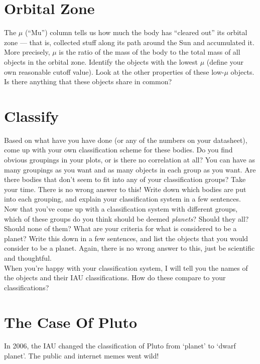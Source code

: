 \documentclass[12pt]{article}
\begin{document}
\section*{Orbital Zone}
The $\mu$ (``Mu'') column tells us how much the body has ``cleared out'' its orbital zone --- that is, collected stuff along its path around the Sun and accumulated it. More precisely, $\mu$ is the ratio of the mass of the body to
the total mass of all objects in the orbital zone. Identify the objects with the lowest $\mu$ (define your own reasonable cutoff value). Look at the other properties of these low-$\mu$ objects. Is there anything that these objects share in common?

\section*{Classify}
Based on what have you have done (or any of the numbers on your datasheet), come up with your own classification scheme for these bodies.  Do you find obvious groupings in your plots, or is there no correlation at all? You can have as many groupings as you want and as many objects in each group as you want.  Are there bodies that don't seem to fit into any of your classification groups? Take your time. There is no wrong answer to this! Write down which bodies are put into each grouping, and explain your classification system in a few sentences.\\

\noindent Now that you've come up with a classification system with different groups, which of these groups do you think should be deemed \emph{planets}? Should they all?  Should none of them?  What are your criteria for what is considered to be a planet?  Write this down in a few sentences, and list the objects that you would consider to be a planet. Again, there is no wrong answer to this, just be scientific and thoughtful. \\

\noindent When you're happy with your classification system, I will tell you the names of the objects and their IAU classifications. How do these compare to your classifications? 

\newpage
\section*{The Case Of Pluto}
In 2006, the IAU changed the classification of Pluto from `planet' to `dwarf planet'. The public and internet memes went wild!
\end{document}
